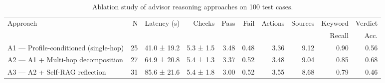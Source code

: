 \begin{table}[h]
\centering
\caption{Ablation study of advisor reasoning approaches on 100 test cases.}
\label{tab:advisor-ablation}
\small
\begin{tabular}{lrrrrrrrrr}
\toprule
Approach & N & Latency (s) & Checks & Pass & Fail & Actions & Sources & Keyword & Verdict \\
         &   &             &        &      &      &         &         & Recall  & Acc.    \\
\midrule
A1 — Profile-conditioned (single-hop) & 25 & 41.0 ± 19.2 & 5.3 ± 1.5 & 3.48 & 0.48 & 3.36 & 9.12 & 0.90 & 0.56 \\
A2 — A1 + Multi-hop decomposition & 27 & 64.9 ± 20.8 & 5.4 ± 1.3 & 3.37 & 0.52 & 3.48 & 9.04 & 0.85 & 0.68 \\
A3 — A2 + Self-RAG reflection & 31 & 85.6 ± 21.6 & 5.4 ± 1.8 & 3.00 & 0.52 & 3.55 & 8.68 & 0.79 & 0.46 \\
\bottomrule
\end{tabular}
\end{table}
